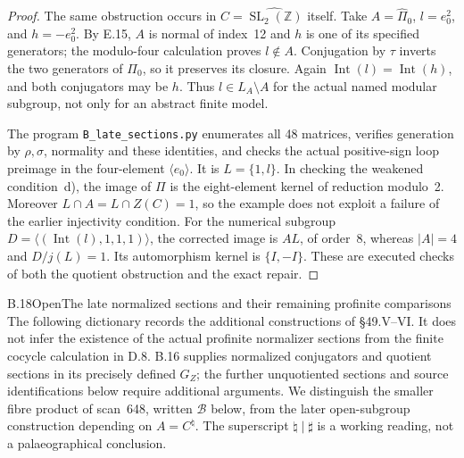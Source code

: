 \begin{proof}
The same obstruction occurs in
\(C=\widehat{\operatorname{SL}_2(\mathbb Z)}\) itself.
Take \(A=\widehat\Pi_0\), \(l=e_0^2\), and
\(h=-e_0^2\).  By E.15, \(A\) is normal of index~12
and \(h\) is one of its specified generators; the
modulo-four calculation proves \(l\notin A\).
Conjugation by \(\tau\) inverts the two generators of
\(\Pi_0\), so it preserves its closure.  Again
\(\operatorname{Int}(l)=\operatorname{Int}(h)\),
and both conjugators may be \(h\).  Thus
\(l\in L_A\setminus A\) for the actual named modular
subgroup, not only for an abstract finite model.

The program \texttt{B\_late\_sections.py} enumerates all
48 matrices, verifies generation by \(\rho,\sigma\),
normality and these identities, and checks the actual
positive-sign loop preimage in the four-element
\(\langle e_0\rangle\).  It is \(L=\{1,l\}\).
In checking the weakened condition~d), the image of \(\Pi\)
is the eight-element kernel of reduction modulo~2.
Moreover \(L\cap A=L\cap Z(C)=1\), so the example does
not exploit a failure of the earlier injectivity condition.
For the numerical subgroup
\(D=\langle(\operatorname{Int}(l),1,1,1)\rangle\),
the corrected image is \(AL\), of order~8, whereas
\(|A|=4\) and \(D/j(L)=1\).  Its automorphism kernel
is \(\{I,-I\}\).  These are executed checks of both
the quotient obstruction and the exact repair.
\end{proof}

\begin{statement}{B.18}{Open}{The late normalized sections and their remaining profinite comparisons}
The following dictionary records the additional constructions
of \S49.V--VI.  It does not infer the existence of the actual
profinite normalizer sections from the finite cocycle calculation
in D.8.  B.16 supplies normalized conjugators and quotient
sections in its precisely defined \(G_Z\); the further
unquotiented sections and source identifications below require
additional arguments.  We distinguish the smaller fibre product of scan~648,
written \(\mathcal B\) below, from the later open-subgroup
construction depending on \(A=C^\natural\).
The superscript \(\natural\mid\sharp\) is a working reading,
not a palaeographical conclusion.
\end{statement}

